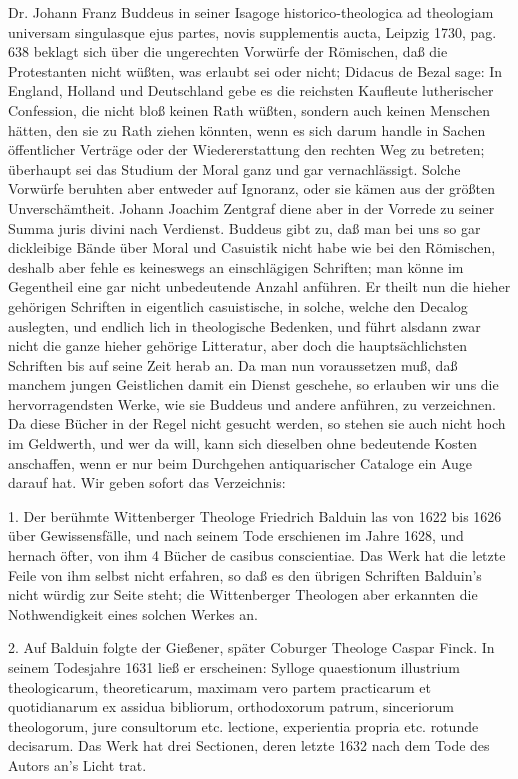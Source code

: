 Dr. Johann Franz Buddeus in seiner Isagoge historico-theologica ad theologiam universam singulasque ejus partes, novis supplementis aucta, Leipzig 1730, pag. 638 beklagt sich über die ungerechten Vorwürfe der Römischen, daß die Protestanten nicht wüßten, was erlaubt sei oder nicht; Didacus de Bezal sage: In England, Holland und Deutschland gebe es die reichsten Kaufleute lutherischer Confession, die nicht bloß keinen Rath wüßten, sondern auch keinen Menschen hätten, den sie zu Rath ziehen könnten, wenn es sich darum handle in Sachen öffentlicher Verträge oder der Wiedererstattung den rechten Weg zu betreten; überhaupt sei das Studium der Moral ganz und gar vernachlässigt. Solche Vorwürfe beruhten aber entweder auf Ignoranz, oder sie kämen aus der größten Unverschämtheit. Johann Joachim Zentgraf diene aber in der Vorrede zu seiner Summa juris divini nach Verdienst. Buddeus gibt zu, daß man bei uns so gar dickleibige Bände über Moral und Casuistik nicht habe wie bei den Römischen, deshalb aber fehle es keineswegs an einschlägigen Schriften; man könne im Gegentheil eine gar nicht unbedeutende Anzahl anführen. Er theilt nun die hieher gehörigen Schriften in eigentlich casuistische, in solche, welche den Decalog auslegten, und endlich
lich in theologische Bedenken, und führt alsdann zwar nicht die ganze hieher gehörige Litteratur, aber doch die hauptsächlichsten Schriften bis auf seine Zeit herab an. Da man nun voraussetzen muß, daß manchem jungen Geistlichen damit ein Dienst geschehe, so erlauben wir uns die hervorragendsten Werke, wie sie Buddeus und andere anführen, zu verzeichnen. Da diese Bücher in der Regel nicht gesucht werden, so stehen sie auch nicht hoch im Geldwerth, und wer da will, kann sich dieselben ohne bedeutende Kosten anschaffen, wenn er nur beim Durchgehen antiquarischer Cataloge ein Auge darauf hat. Wir geben sofort das Verzeichnis:

1. Der berühmte Wittenberger Theologe Friedrich Balduin las von 1622 bis 1626 über Gewissensfälle, und nach seinem Tode erschienen im Jahre 1628, und hernach öfter, von ihm 4 Bücher de casibus conscientiae. Das Werk hat die letzte Feile von ihm selbst nicht erfahren, so daß es den übrigen Schriften Balduin’s nicht würdig zur Seite steht; die Wittenberger Theologen aber erkannten die Nothwendigkeit eines solchen Werkes an.

2. Auf Balduin folgte der Gießener, später Coburger Theologe Caspar Finck. In seinem Todesjahre 1631 ließ er erscheinen: Sylloge quaestionum illustrium theologicarum, theoreticarum, maximam vero partem practicarum et quotidianarum ex assidua bibliorum, orthodoxorum patrum, sinceriorum theologorum, jure consultorum etc. lectione, experientia propria etc. rotunde decisarum. Das Werk hat drei Sectionen, deren letzte 1632 nach dem Tode des Autors an’s Licht trat.

